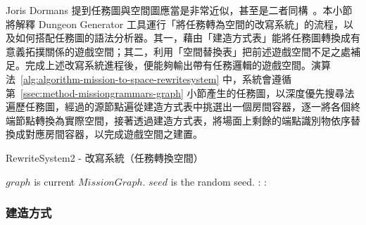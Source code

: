 Joris Dormans 提到任務圖與空間圖應當是非常近似，甚至是二者同構~\cite{dormans2010adventures}。本小節將解釋 Dungeon Generator 工具運行「將任務轉為空間的改寫系統」的流程，以及如何搭配任務圖的語法分析器。其一，藉由「建造方式表」能將任務圖轉換成有意義拓撲關係的遊戲空間；其二，利用「空間替換表」把前述遊戲空間不足之處補足。完成上述改寫系統進程後，便能夠輸出帶有任務邏輯的遊戲空間。演算法~\ref{alg:algorithm-mission-to-space-rewritesystem} 中，系統會遵循第~\ref{ssec:method-missiongrammars-graph} 小節產生的任務圖，以深度優先搜尋法遍歷任務圖，經過的源節點遍從建造方式表中挑選出一個房間容器，逐一將各個終端節點轉換為實際空間，接著透過建造方式表，將場面上剩餘的端點識別物依序替換成對應房間容器，以完成遊戲空間之建置。

\begin{algorithm}[ht]
    \caption{RewriteSystem2 - 改寫系統（任務轉換空間）}
    \label{alg:algorithm-mission-to-space-rewritesystem}
    \begin{algorithmic}[1]
        \Require
            \Statex $graph$ is current $MissionGraph$.
            \Statex $seed$ is the random seed.
        \Ensure
            :                             
                           
                \EndIf
            \EndFor
            :            
                           
                \EndIf
            \EndFor \\
                                                                    
        \Statex
    \end{algorithmic}
\end{algorithm}

\subsubsection{建造方式}
\label{sssec:method-spacepieces-frommissiontospace-instruction}


